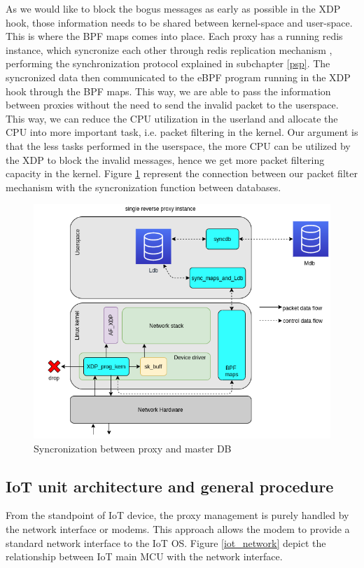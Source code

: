 \documentclass[sigplan,screen]{acmart}
\begin{document}
As we would like to block the bogus messages as early as possible in the XDP hook, those information needs to be shared between kernel-space and user-space. This is where the BPF maps comes into place. Each proxy has a running redis instance, which syncronize each other through redis replication mechanism \cite{redissync}, performing the synchronization protocol explained in subchapter \ref{psp}. The syncronized data then communicated to the eBPF program running in the XDP hook through the BPF maps. This way, we are able to pass the information between proxies without the need to send the invalid packet to the userspace. This way, we can reduce the CPU utilization in the userland and allocate the CPU into more important task, i.e. packet filtering in the kernel. Our argument is that the less tasks performed in the userspace, the more CPU can be utilized by the XDP to block the invalid messages, hence we get more packet filtering capacity in the kernel. Figure \ref{proxies_xdp} represent the connection between our packet filter mechanism with the syncronization function between databases.

\begin{figure}[htbp]
\centerline{\includegraphics[scale=0.35]{pic/proxies_xdp.png}}
\caption{Syncronization between proxy and master DB}
\label{proxies_xdp}
\end{figure}

\subsection{IoT unit architecture and general procedure}
From the standpoint of IoT device, the proxy management is purely handled by the network interface or modems. This approach allows the modem to provide a standard network interface to the IoT OS. Figure \ref{iot_network} depict the relationship between IoT main MCU with the network interface. 
\end{document}
